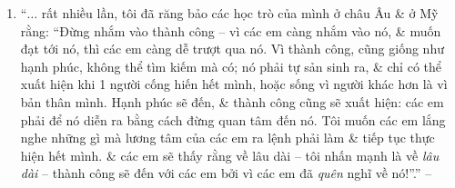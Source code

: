 \documentclass[oneside]{book}
\numberwithin{equation}{section}
\begin{document}
\begin{enumerate}[leftmargin=0mm]
	``I therefore felt responsible for writing down what I had gone through, for I thought it might be helpful to people who are prone\footnote{\textbf{prone} [a] \textbf{1.} likely to suffer from something or to do something bad, \textsc{synonym}: \textbf{liable}; \textbf{2.} (\textbf{-prone}) (in adjectives) likely to suffer or do the thing mentioned; \textbf{3.} lying flat with the front of your body touching the ground.} to despair\footnote{\textbf{despair} [n] [uncountable] the feeling of having lost all hope; [v] [intransitive] to stop having any hope that a situation will change or improve.}.'' -- \cite[Preface to the 1992 Edition, p. 12]{Frankl2013}
	\item ``$\ldots$ rất nhiều lần, tôi đã răng bảo các học trò của mình ở châu Âu \& ở Mỹ rằng: ``Đừng nhắm vào thành công -- vì các em càng nhắm vào nó, \& muốn đạt tới nó, thì các em càng dễ trượt qua nó. Vì thành công, cũng giống như hạnh phúc, không thể tìm kiếm mà có; nó phải tự sản sinh ra, \& chỉ có thể xuất hiện khi 1 người cống hiến hết mình, hoặc sống vì người khác hơn là vì bản thân mình. Hạnh phúc sẽ đến, \& thành công cũng sẽ xuất hiện: các em phải để nó diễn ra bằng cách đừng quan tâm đến nó. Tôi muốn các em lắng nghe những gì mà lương tâm của các em ra lệnh phải làm \& tiếp tục thực hiện hết mình. \& các em sẽ thấy rằng về lâu dài -- tôi nhấn mạnh là về \textit{lâu dài} -- thành công sẽ đến với các em bởi vì các em đã \textit{quên} nghĩ về nó!''.'' -- \cite[p. 13]{Frankl2022}
	

\end{enumerate}
\end{document}
